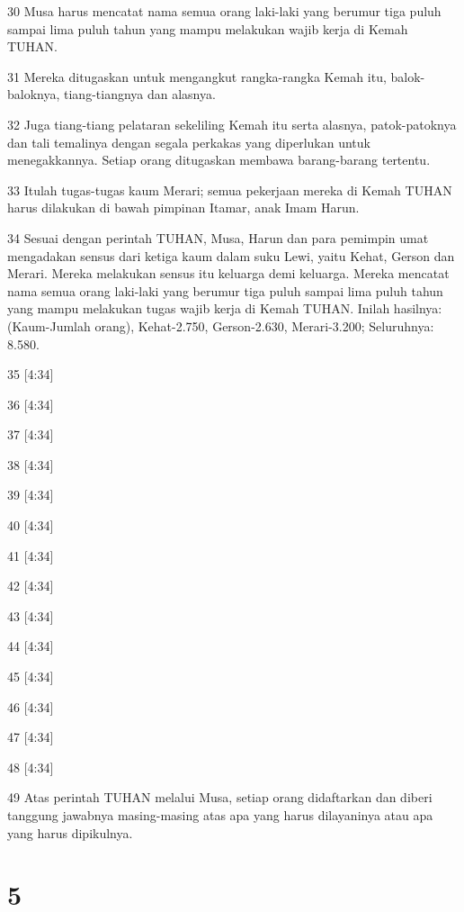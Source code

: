 \par 30 Musa harus mencatat nama semua orang laki-laki yang berumur tiga puluh sampai lima puluh tahun yang mampu melakukan wajib kerja di Kemah TUHAN.
\par 31 Mereka ditugaskan untuk mengangkut rangka-rangka Kemah itu, balok-baloknya, tiang-tiangnya dan alasnya.
\par 32 Juga tiang-tiang pelataran sekeliling Kemah itu serta alasnya, patok-patoknya dan tali temalinya dengan segala perkakas yang diperlukan untuk menegakkannya. Setiap orang ditugaskan membawa barang-barang tertentu.
\par 33 Itulah tugas-tugas kaum Merari; semua pekerjaan mereka di Kemah TUHAN harus dilakukan di bawah pimpinan Itamar, anak Imam Harun.
\par 34 Sesuai dengan perintah TUHAN, Musa, Harun dan para pemimpin umat mengadakan sensus dari ketiga kaum dalam suku Lewi, yaitu Kehat, Gerson dan Merari. Mereka melakukan sensus itu keluarga demi keluarga. Mereka mencatat nama semua orang laki-laki yang berumur tiga puluh sampai lima puluh tahun yang mampu melakukan tugas wajib kerja di Kemah TUHAN. Inilah hasilnya: (Kaum-Jumlah orang), Kehat-2.750, Gerson-2.630, Merari-3.200; Seluruhnya: 8.580.
\par 35 [4:34]
\par 36 [4:34]
\par 37 [4:34]
\par 38 [4:34]
\par 39 [4:34]
\par 40 [4:34]
\par 41 [4:34]
\par 42 [4:34]
\par 43 [4:34]
\par 44 [4:34]
\par 45 [4:34]
\par 46 [4:34]
\par 47 [4:34]
\par 48 [4:34]
\par 49 Atas perintah TUHAN melalui Musa, setiap orang didaftarkan dan diberi tanggung jawabnya masing-masing atas apa yang harus dilayaninya atau apa yang harus dipikulnya.

\chapter{5}

